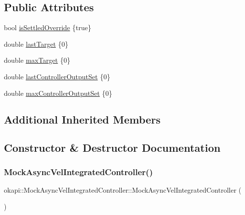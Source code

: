 \subsection*{Public Attributes}
\begin{DoxyCompactItemize}
\item 
bool \mbox{\hyperlink{classokapi_1_1MockAsyncVelIntegratedController_a8fb0faaecc38a8d44539522d12960498}{is\+Settled\+Override}} \{true\}
\item 
double \mbox{\hyperlink{classokapi_1_1MockAsyncVelIntegratedController_a8a255e48801d78edde86aa41ffbdbe93}{last\+Target}} \{0\}
\item 
double \mbox{\hyperlink{classokapi_1_1MockAsyncVelIntegratedController_af51f5802f001c86f5e21a95c7deebd64}{max\+Target}} \{0\}
\item 
double \mbox{\hyperlink{classokapi_1_1MockAsyncVelIntegratedController_a78484972362ae33c81eda7105252b858}{last\+Controller\+Output\+Set}} \{0\}
\item 
double \mbox{\hyperlink{classokapi_1_1MockAsyncVelIntegratedController_a5e60d07256c8c7eead8e02a1d8e9b13a}{max\+Controller\+Output\+Set}} \{0\}
\end{DoxyCompactItemize}
\subsection*{Additional Inherited Members}


\subsection{Constructor \& Destructor Documentation}
\mbox{\label{classokapi_1_1MockAsyncVelIntegratedController_a3f8369a777935bd0ee078e1683856a71}} 
\subsubsection{\texorpdfstring{MockAsyncVelIntegratedController()}{MockAsyncVelIntegratedController()}}
{\footnotesize\ttfamily okapi\+::\+Mock\+Async\+Vel\+Integrated\+Controller\+::\+Mock\+Async\+Vel\+Integrated\+Controller (\begin{DoxyParamCaption}{ }\end{DoxyParamCaption})}



